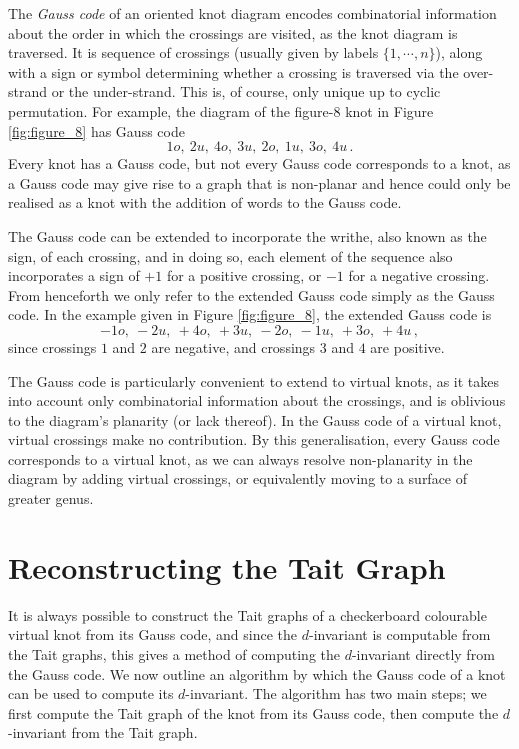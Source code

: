 \documentclass[12pt]{report}
\begin{document}
The \textit{Gauss code} of an oriented knot diagram encodes combinatorial information about the order in which the crossings are visited, as the knot diagram is traversed. It is sequence of crossings (usually given by labels $\{1, \cdots, n\}$), along with a sign or symbol determining whether a crossing is traversed via the over-strand or the under-strand. This is, of course, only unique up to cyclic permutation. For example, the diagram of the figure-8 knot in Figure \ref{fig:figure_8} has Gauss code
\[1o,\ 2u,\ 4o,\ 3u,\ 2o,\ 1u,\ 3o,\ 4u\,.\]
Every knot has a Gauss code, but not every Gauss code corresponds to a knot, as a Gauss code may give rise to a graph that is non-planar and hence could only be realised as a knot with the addition of words to the Gauss code.

The Gauss code can be extended to incorporate the writhe, also known as the sign, of each crossing, and in doing so, each element of the sequence also incorporates a sign of $+1$ for a positive crossing, or $-1$ for a negative crossing. From henceforth we only refer to the extended Gauss code simply as the Gauss code. In the example given in Figure \ref{fig:figure_8}, the extended Gauss code is 
\[-1o,\ -2u,\ +4o,\ +3u,\ -2o,\ -1u,\ +3o,\ +4u\,,\]
since crossings $1$ and $2$ are negative, and crossings $3$ and $4$ are positive.

The Gauss code is particularly convenient to extend to virtual knots, as it takes into account only combinatorial information about the crossings, and is oblivious to the diagram's planarity (or lack thereof). In the Gauss code of a virtual knot, virtual crossings make no contribution. By this generalisation, every Gauss code corresponds to a virtual knot, as we can always resolve non-planarity in the diagram by adding virtual crossings, or equivalently moving to a surface of greater genus.

\section{Reconstructing the Tait Graph}

It is always possible to construct the Tait graphs of a checkerboard colourable virtual knot from its Gauss code, and since the $d$-invariant is computable from the Tait graphs, this gives a method of computing the $d$-invariant directly from the Gauss code. We now outline an algorithm by which the Gauss code of a knot can be used to compute its $d$-invariant. The algorithm has two main steps; we first compute the Tait graph of the knot from its Gauss code, then compute the $d$-invariant from the Tait graph.
\end{document}

